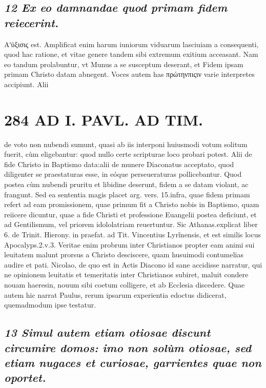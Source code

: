 \documentclass{article}
\begin{document}
\begin{pages}
\subsection*{\textit{12 Ex eo damnandae quod primam fidem reiecerint. }}\pstart Αʹὐξισις est. Amplificat enim harum iuniorum viduarum lasciuiam a consequenti, quod hac ratione, et vitae genere tandem sibi extremum exitium acceasant. Nam eo tandum prolabuntur, vt Munus a se susceptum deserant, et Fidem ipsam primam Christo datam abnegent. Voces autem has πρώτηνπιςιν varie interpretes accipiunt. Alii  \pend
\section*{284 AD I. PAVL. AD TIM. }
\marginpar{[ p.]}\pstart de voto non nubendi sumunt, quasi ab iis interponi huiusmodi votum solitum fuerit, cùm eligebantur: quod nullo certe scripturae loco probari potest. Alii de fide Christo in Baptismo data:alii de munere Diaconatus acceptato, quod diligenter se praestaturas esse, in eóque perseueraturas pollicebantur. Quod postea cùm nubendi pruritu et libidine deserunt, fidem a se datam violant, ac frangunt. Sed ea sententia magis placet arg. vers. 15.infra, quae fidem primam refert ad eam promissionem, quae primum fit a Christo nobis in Baptismo, quam reiicere dicuntur, quae a fide Christi et professione Euangelii postea deficiunt, et ad Gentilismum, vel priorem idololatriam reuertuntur. Sic Athanas.explicat liber 6. de Trinit. Hierony. in praefat. ad Tit. Vincentius Lyrĩnensis, et est similis locus Apocalyps.2.v.3. Veritae enim probrum inter Christianos propter eam animi sui leuitatem malunt prorsus a Christo desciscere, quam husuimodi contumelias audire et pati. Nicolao, de quo est in Actis Diacono id sane accidisse narratur, qui ne opinionem leuitatis et temeritatis inter Christianos subiret, maluit condere nouam haeresin, nouum sibi coetum colligere, et ab Ecclesia discedere.  \pend\pstart Quae autem hic narrat Paulus, rerum ipsarum experientia edoctus didicerat, quemadmodum ipse testatur.  \pend
{}
{}
\subsection*{\textit{13 Simul autem etiam otiosae discunt circumire domos: imo non solùm otiosae, sed etiam nugaces et curiosae, garrientes quae non oportet. }}

\end{pages}
\end{document}
